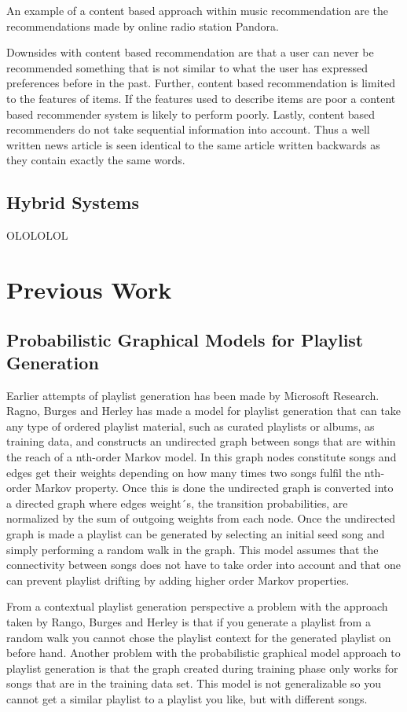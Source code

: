 An example of a content based approach within music recommendation are the recommendations made by online radio station Pandora. 

Downsides with content based recommendation are that a user can never be recommended something that is not similar to what the user has expressed preferences before in the past. Further, content based recommendation is limited to the features of items. If the features used to describe items are poor a content based recommender system is likely to perform poorly. Lastly, content based recommenders do not take sequential information into account. Thus a well written news article is seen identical to the same article written backwards as they contain exactly the same words\cite{adomavicius2005toward}.

\section{Hybrid Systems}
OLOLOLOL

\chapter{Previous Work}
\section{Probabilistic Graphical Models for Playlist Generation}
Earlier attempts of playlist generation has been made by Microsoft Research. Ragno, Burges and Herley has made a model for playlist generation that can take any type of ordered playlist material, such as curated playlists or albums, as training data, and constructs an undirected graph between songs that are within the reach of a nth-order Markov model. In this graph nodes constitute songs and edges get their weights depending on how many times two songs fulfil the nth-order Markov property. Once this is done the undirected graph is converted into a directed graph where edges weight´s, the transition probabilities, are normalized by the sum of outgoing weights from each node. Once the undirected graph is made a playlist can be generated by selecting an initial seed song and simply performing a random walk in the graph. This model assumes that the connectivity between songs does not have to take order into account and that one can prevent playlist drifting by adding higher order Markov properties\cite{ragno2005inferring}. 

From a contextual playlist generation perspective a problem with the approach taken by Rango, Burges and Herley is that if you generate a playlist from a random walk you cannot chose the playlist context for the generated playlist on before hand. Another problem with the probabilistic graphical model approach to playlist generation is that the graph created during training phase only works for songs that are in the training data set. This model is not generalizable so you cannot get a similar playlist to a playlist you like, but with different songs.

